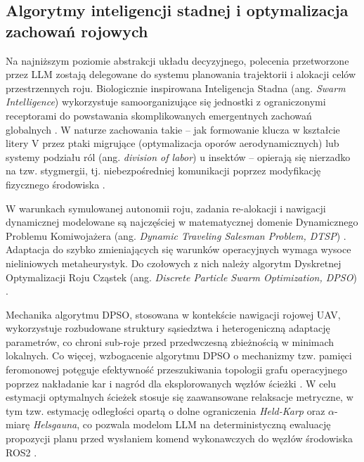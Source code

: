 \subsection{Algorytmy inteligencji stadnej i optymalizacja zachowań rojowych}
Na najniższym poziomie abstrakcji układu decyzyjnego, polecenia przetworzone przez LLM zostają delegowane do systemu planowania trajektorii i alokacji celów przestrzennych roju. Biologicznie inspirowana Inteligencja Stadna (ang. \textit{Swarm Intelligence}) wykorzystuje samoorganizujące się jednostki z ograniczonymi receptorami do powstawania skomplikowanych emergentnych zachowań globalnych \cite{bonabeau1999, kennedy2001}. W naturze zachowania takie -- jak formowanie klucza w kształcie litery V przez ptaki migrujące (optymalizacja oporów aerodynamicznych) lub systemy podziału ról (ang. \textit{division of labor}) u insektów -- opierają się nierzadko na tzw. stygmergii, tj. niebezpośredniej komunikacji poprzez modyfikację fizycznego środowiska \cite{bonabeau1999, kennedy2001}.

W warunkach symulowanej autonomii roju, zadania re-alokacji i nawigacji dynamicznej modelowane są najczęściej w matematycznej domenie Dynamicznego Problemu Komiwojażera (ang. \textit{Dynamic Traveling Salesman Problem, DTSP}) \cite{strak2017}. Adaptacja do szybko zmieniających się warunków operacyjnych wymaga wysoce nieliniowych metaheurystyk. Do czołowych z nich należy algorytm Dyskretnej Optymalizacji Roju Cząstek (ang. \textit{Discrete Particle Swarm Optimization, DPSO}) \cite{strak2017}.

Mechanika algorytmu DPSO, stosowana w kontekście nawigacji rojowej UAV, wykorzystuje rozbudowane struktury sąsiedztwa i heterogeniczną adaptację parametrów, co chroni sub-roje przed przedwczesną zbieżnością w minimach lokalnych. Co więcej, wzbogacenie algorytmu DPSO o mechanizmy tzw. pamięci feromonowej potęguje efektywność przeszukiwania topologii grafu operacyjnego poprzez nakładanie kar i nagród dla eksplorowanych węzłów ścieżki \cite{strak2017}. W celu estymacji optymalnych ścieżek stosuje się zaawansowane relaksacje metryczne, w tym tzw. estymację odległości opartą o dolne ograniczenia \textit{Held-Karp} oraz $\alpha$-miarę \textit{Helsgauna}, co pozwala modelom LLM na deterministyczną ewaluację propozycji planu przed wysłaniem komend wykonawczych do węzłów środowiska ROS2 \cite{strak2017}.